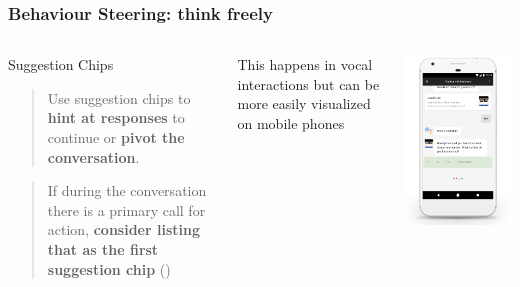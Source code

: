 \documentclass{beamer}
\begin{document}
\begin{frame}[allowframebreaks]
\frametitle{Behaviour Steering: think freely}

	\begin{columns}
			\begin{block}{Suggestion Chips}
		 		\begin{quote}
		 			Use suggestion chips to \textbf{hint at responses} to continue or \textbf{pivot the conversation}.
		 		\end{quote}
		 			
		 		\begin{quote}
		 			If during the conversation there is a primary call for action, \textbf{consider listing that as the first suggestion chip} (\cite{googleactions})
		 		\end{quote}
	 		\end{block}
 		\bigskip
 		
 		This happens in vocal interactions but can be more easily visualized on mobile phones
	 		
			\centering
			\includegraphics[width=1.0\linewidth]{images/suggestion-chip}
	\end{columns}
\framebreak


\end{frame}
\end{document}
